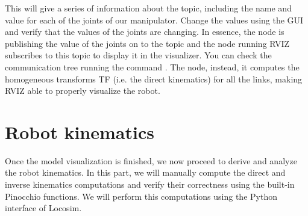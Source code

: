 \documentclass[11pt]{article}
\begin{document}
This will give a series of information about the  topic, including the name and value for each of the joints of our manipulator. Change the values using the GUI and verify that the values of the joints are changing. In essence, the  node is publishing the value of the joints on to the  topic and the node running RVIZ subscribes to this topic to display it in the visualizer. You can check the communication tree running the command  . 
The  node, instead, it computes the homogeneous transforms TF (i.e. the direct kinematics) for all the links, making RVIZ able to properly visualize the robot. 

\section{Robot kinematics}
Once the model visualization is finished, we now proceed to derive and analyze the robot kinematics. In this part, we will manually compute the direct and inverse kinematics computations and verify their correctness using the built-in Pinocchio functions. We will perform this computations using the Python interface of Locosim. \\
\end{document}
